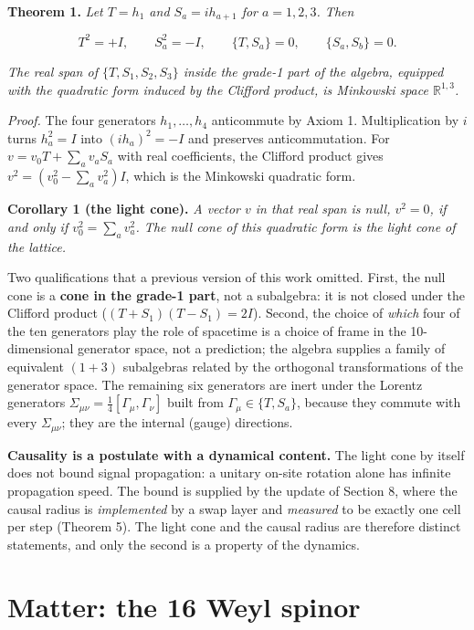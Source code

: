\documentclass[aps,prd,amsmath,amssymb,superscriptaddress,longbibliography,floatfix,preprint]{revtex4-2}
\begin{document}
\textbf{Theorem 1.} \emph{Let $T = h_1$ and $S_a = i h_{a+1}$ for $a = 1,\allowbreak{}2,\allowbreak{}3$. Then}

\[T^2 = +I,\qquad S_a^2 = -I,\qquad \{T,S_a\} = 0,\qquad \{S_a,S_b\} = 0 .\]

\emph{The real span of $\{T,\allowbreak{} S_1,\allowbreak{} S_2,\allowbreak{} S_3\}$ inside the grade-1 part of the algebra, equipped with the quadratic form induced by the Clifford product, is Minkowski space $\mathbb{R}^{1,\allowbreak{}3}$.}

\emph{Proof.} The four generators $h_1,\allowbreak{}\dots,\allowbreak{}h_4$ anticommute by Axiom 1. Multiplication by $i$ turns $h_a^2 = I$ into $(i h_a)^2 = -I$ and preserves anticommutation. For $v = v_0 T + \sum_a v_a S_a$ with real coefficients, the Clifford product gives $v^2 = (v_0^2 - \sum_a v_a^2)I$, which is the Minkowski quadratic form.

\textbf{Corollary 1 (the light cone).} \emph{A vector $v$ in that real span is null, $v^2 = 0$, if and only if $v_0^2 = \sum_a v_a^2$. The null cone of this quadratic form is the light cone of the lattice.}

Two qualifications that a previous version of this work omitted. First, the null cone is a \textbf{cone in the grade-1 part}, not a subalgebra: it is not closed under the Clifford product ($(T+S_1)(T-S_1) = 2I$). Second, the choice of \emph{which} four of the ten generators play the role of spacetime is a choice of frame in the 10-dimensional generator space, not a prediction; the algebra supplies a family of equivalent $(1{+}3)$ subalgebras related by the orthogonal transformations of the generator space. The remaining six generators are inert under the Lorentz generators $\Sigma_{\mu\nu} = \tfrac14[\Gamma_\mu,\allowbreak{}\Gamma_\nu]$ built from $\Gamma_\mu \in \{T,\allowbreak{}S_a\}$, because they commute with every $\Sigma_{\mu\nu}$; they are the internal (gauge) directions.

\textbf{Causality is a postulate with a dynamical content.} The light cone by itself does not bound signal propagation: a unitary on-site rotation alone has infinite propagation speed. The bound is supplied by the update of Section 8, where the causal radius is \emph{implemented} by a swap layer and \emph{measured} to be exactly one cell per step (Theorem 5). The light cone and the causal radius are therefore distinct statements, and only the second is a property of the dynamics.

\section{Matter: the 16 Weyl spinor}
\end{document}
